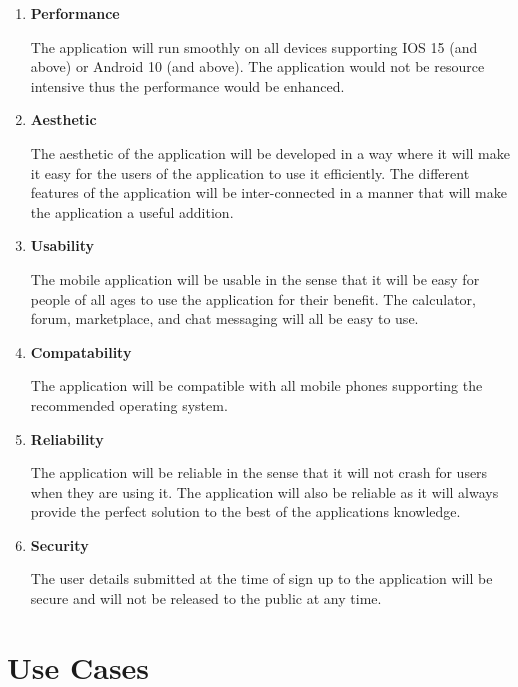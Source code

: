 \documentclass{article}
\begin{document}
\begin{enumerate}

      \item \textbf{Performance}

            The application will run smoothly on all devices supporting IOS 15 (and above)
            or Android 10 (and above). The application would not be resource intensive thus
            the performance would be enhanced.

      \item \textbf{Aesthetic}

            The aesthetic of the application will be developed in a way where it will make
            it easy for the users of the application to use it efficiently. The different
            features of the application will be inter-connected in a manner that will make
            the application a useful addition.

      \item \textbf{Usability}

            The mobile application will be usable in the sense that it will be easy for
            people of all ages to use the application for their benefit. The calculator,
            forum, marketplace, and chat messaging will all be easy to use.

      \item \textbf{Compatability}

            The application will be compatible with all mobile phones supporting the
            recommended operating system.

      \item \textbf{Reliability}

            The application will be reliable in the sense that it will not crash for users
            when they are using it. The application will also be reliable as it will always
            provide the perfect solution to the best of the applications knowledge.

      \item \textbf{Security}

            The user details submitted at the time of sign up to the application will be
            secure and will not be released to the public at any time.

\end{enumerate}

\section*{Use Cases}
\end{document}
